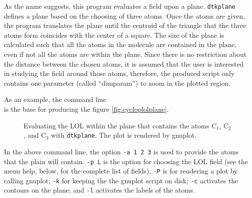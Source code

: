 As the name suggests, this program evaluates a field upon a plane. \texttt{dtkplane} defines
a plane based on the choosing of three atoms. Once the atoms are given, the program translates the plane until the centroid of the triangle that the three atoms form coincides with the center of a square. The size of the plane is calculated such that all the atoms in the molecule are contained in the plane, even if not all the atoms are within the plane. Since there is no restriction about the distance between the chosen atoms, it is assumed that the user is interested in studying the field around those atoms, therefore, the produced script only contains one parameter (called ``dimparam'') to zoom in the plotted region.

As an example, the command line\\
is the base for producing the figure \ref{fig:cycloplolplane}. 
%
\begin{figure}[h!]
\centering
{}\qquad\qquad%
\caption{Evaluating the LOL within the plane that contains the atoms C$_1$, C$_2$, and C$_3$ with \texttt{dtkplane}. The plot is rendered by gnuplot.}\label{fig:dtkplaneuseex}
\end{figure}
%

In the above command line, the option \texttt{-a 1 2 3} is used to provide the atoms that the plain will contain. \texttt{-p L} is the option for choosing the LOL field (see the menu help, below, for the complete list of fields); \texttt{-P} is for rendering a plot by calling gnuplot; \texttt{-k} for keeping the the gnuplot script on disk; \texttt{-c} activates the contours on the plane; and \texttt{-l} activates the labels of the atoms.

